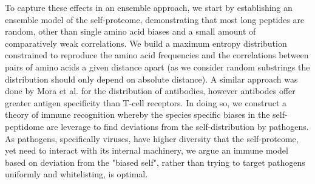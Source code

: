 \documentclass[superscriptaddress,twocolumn,pre]{revtex4}
\newcommand{\<}{\langle}
\renewcommand{\>}{\rangle}
\begin{document}
To capture these effects in an ensemble approach, we start by establishing an ensemble model of the self-proteome, demonstrating that most long peptides are random, other than single amino acid biases and a small amount of comparatively weak correlations. We build a maximum entropy distribution constrained to reproduce the amino acid frequencies and the correlations between pairs of amino acids a given distance apart (as we consider random substrings the distribution should only depend on absolute distance). A similar approach was done by Mora et al. \cite{Mora2010} for the distribution of antibodies, however antibodes offer greater antigen specificity than T-cell receptors. In doing so, we construct a theory of immune recognition whereby the species specific biases in the self-peptidome are leverage to find deviations from the self-distribution by pathogens. As pathogens, specifically viruses, have higher diversity that the self-proteome, yet need to interact with its internal machinery, we argue an immune model based on deviation from the "biased self", rather than trying to target pathogens uniformly and whitelisting, is optimal. 




\end{document}
